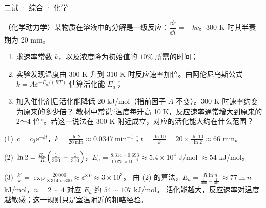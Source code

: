 \documentclass[cjk=noto, seal=first]{mojing-exam}
\begin{document}
\begin{paper}[time={建议 1.5 小时（训练设置）}, full=100]{二试 · 综合 · 化学}
\begin{questions}
\question[25]
（化学动力学）某物质在溶液中的分解是一级反应：$\dfrac{\dd c}{\dd t}=-kc$。300 K 时其半衰期为 20 min。
\begin{enumerate}
  \item 求速率常数 $k$，以及浓度降为初始值的 $10\%$ 所需的时间；
  \item 实验发现温度由 300 K 升到 310 K 时反应速率加倍。由阿伦尼乌斯公式 $k=A\ee^{-E_a/(RT)}$ 估算活化能 $E_a$；
  \item 加入催化剂后活化能降低 20 kJ/mol（指前因子 $A$ 不变）。300 K 时速率约变为原来的多少倍？
        教材中常说“温度每升高 10 K，反应速率通常增大到原来的 2～4 倍”。若这一说法在 300 K 附近成立，对应的活化能大约在什么范围？
\end{enumerate}
\answerspace{2cm}
\begin{solution}
(1)~$c=c_0\ee^{-kt}$，$k=\frac{\ln2}{20\ \mathrm{min}}\approx0.0347\ \mathrm{min^{-1}}$；$t=\frac{\ln10}{k}=20\times\frac{\ln10}{\ln2}\approx66$ min。

(2)~$\ln2=\frac{E_a}R\Bigl(\frac1{300}-\frac1{310}\Bigr)$，$E_a=\frac{8.314\times0.693}{1.075\times10^{-4}}\approx5.4\times10^4$ J/mol $\approx54$ kJ/mol。

(3)~$\frac{k'}{k}=\exp\frac{20\,000}{8.314\times300}\approx\ee^{8.0}\approx3\times10^3$。
由 (2) 的算法，$E_a=\frac{R\ln n}{\frac1{300}-\frac1{310}}\approx77\ln n$ kJ/mol，$n=2\sim4$ 对应 $E_a$ 约 $54\sim107$ kJ/mol。
活化能越大，反应速率对温度越敏感；这一规则只是室温附近的粗略经验。
\end{solution}

\end{questions}
\end{paper}
\end{document}
